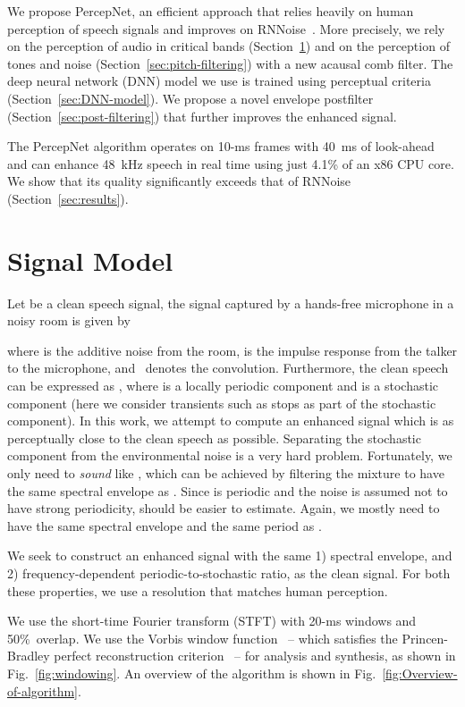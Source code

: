 \documentclass[english]{article}
\begin{document}
We propose PercepNet, an efficient approach that relies heavily on
human perception of speech signals and improves on RNNoise~\cite{valin2018rnnoise}.
More precisely, we rely on the perception of audio in critical bands
(Section~\ref{sec:signal-model}) and on the perception of tones
and noise (Section~\ref{sec:pitch-filtering}) with a new acausal
comb filter. The deep neural network (DNN) model we use is trained
using perceptual criteria (Section~\ref{sec:DNN-model}). We propose
a novel envelope postfilter (Section~\ref{sec:post-filtering}) that
further improves the enhanced signal. 

The PercepNet algorithm operates on 10\nobreakdash-ms frames with
40~ms of look-ahead and can enhance 48~kHz speech in real time using
just 4.1\% of an x86 CPU core. We show that its quality significantly
exceeds that of RNNoise (Section~\ref{sec:results}).


\section{Signal Model}

\label{sec:signal-model}

Let  be a clean speech signal, the signal captured
by a hands-free microphone in a noisy room is given by

where  is the additive noise from the room, 
is the impulse response from the talker to the microphone, and ~denotes
the convolution. Furthermore, the clean speech can be expressed as
, where 
is a locally periodic component and  is a stochastic
component (here we consider transients such as stops as part of the
stochastic component). In this work, we attempt to compute an enhanced
signal 
which is as perceptually close to the clean speech 
as possible. Separating the stochastic component 
from the environmental noise  is a very hard
problem. Fortunately, we only need  to \emph{sound}
like , which can be achieved by filtering the mixture
 to have
the same spectral envelope as . Since 
is periodic and the noise is assumed not to have strong periodicity,
 should be easier to estimate. Again, we mostly
need  to have the same spectral envelope and
the same period as .

We seek to construct an enhanced signal with the same 1) spectral
envelope, and 2) frequency-dependent periodic-to-stochastic ratio,
as the clean signal. For both these properties, we use a resolution
that matches human perception.

We use the short-time Fourier transform (STFT) with 20\nobreakdash-ms
windows and 50\%~overlap. We use the Vorbis window function~\cite{montgomery2004vorbis}
-- which satisfies the Princen-Bradley perfect reconstruction criterion~\cite{princen1986analysis}
-- for analysis and synthesis, as shown in Fig.~\ref{fig:windowing}.
An overview of the algorithm is shown in Fig.~\ref{fig:Overview-of-algorithm}.
\end{document}
